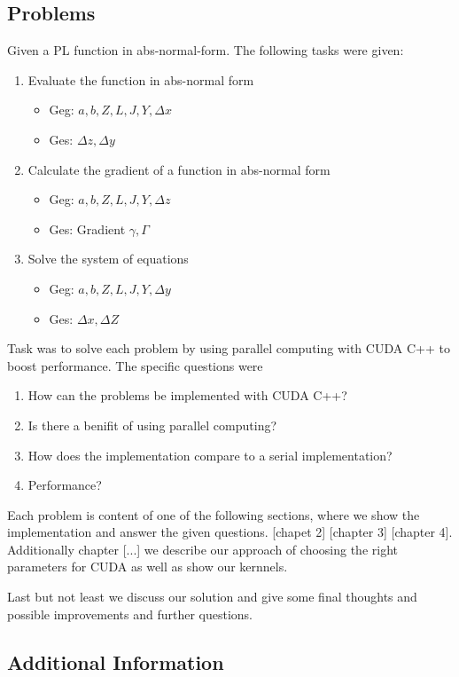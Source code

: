 \subsection{Problems}
Given a PL function in abs-normal-form. The following tasks were given:
\begin{enumerate}
	\item Evaluate the function in abs-normal form
	\begin{itemize}
		\item Geg: $a,b,Z,L,J,Y,\Delta x$
		\item Ges: $\Delta z, \Delta y$
	\end{itemize}
	\item Calculate the gradient of a function in abs-normal form
	\begin{itemize}
		\item Geg: $a,b,Z,L,J,Y, \Delta z$
		\item Ges: Gradient $\gamma, \Gamma$
	\end{itemize}
	\item Solve the system of equations
	\begin{itemize}
		\item Geg: $a,b,Z,L,J,Y,\Delta y$
		\item Ges: $\Delta x, \Delta Z$
	\end{itemize}
\end{enumerate}
Task was to solve each problem by using parallel computing with CUDA C++ to boost performance.
The specific questions were
\begin{enumerate}
	\item How can the problems be implemented with CUDA C++?
	\item Is there a benifit of using parallel computing?
	\item How does the implementation compare to a serial implementation?
	\item Performance?
\end{enumerate}
Each problem is content of one of the following sections, where we show the implementation and answer the given questions. [chapet 2] [chapter 3] [chapter 4]. \\

Additionally chapter [...] we describe our approach of choosing the right parameters for CUDA as well as show our kernnels.

Last but not least we discuss our solution and give some final thoughts and possible improvements and further questions.

\subsection{Additional Information}
